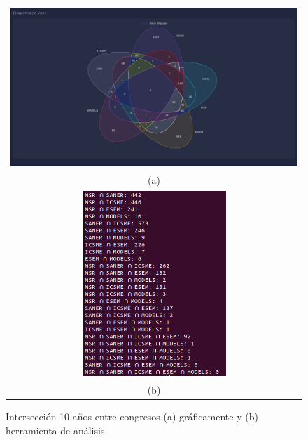 \documentclass[a4paper, 12pt]{book}
\begin{document}
\begin{figure}[!h]
    \centering
    \begin{tabular}{c}
    \includegraphics[width=1\textwidth]{img/inter_10_years_graph.png} \\
    (a) \\
    \includegraphics[width=0.5\textwidth]{img/inter_10_years.png} \\
    (b)
    \end{tabular}
    \caption{Intersección 10 años entre congresos (a) gráficamente y (b) herramienta de análisis.}
    \label{fig:comp_inter_10_year}
\end{figure}



\cleardoublepage


\end{document}
